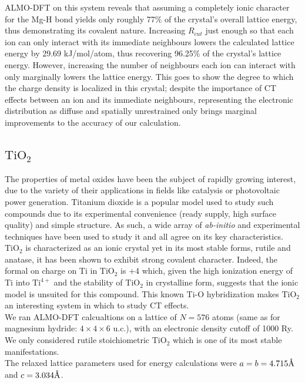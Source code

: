\documentclass[aps,prb,twocolumn,amsmath,amssymb,superscriptaddress,longbibliography]{revtex4-1}
\newcommand{\angstrom}{\text{\normalfont\AA}}
\begin{document}
ALMO-DFT on this system reveals that assuming a completely ionic character for the Mg-H bond yields only roughly 77\% of the crystal's overall lattice energy, thus demonstrating its covalent nature. 
Increasing $R_{cut}$ just enough so that each ion can only interact with its immediate neighbours lowers the calculated lattice energy by 29.69 kJ/mol/atom, thus recovering 96.25\% of the crystal's lattice energy. 
However, increasing the number of neighbours each ion can interact with only marginally lowers the lattice energy. 
This goes to show the degree to which the charge density is localized in this crystal; despite the importance of CT effects between an ion and its immediate neighbours, representing the electronic distribution as diffuse and spatially unrestrained only brings marginal improvements to the accuracy of our calculation.




\subsection*{$\text{TiO}_{2}$}


The properties of metal oxides have been the subject of rapidly growing interest, due to the variety of their applications in fields like catalysis or photovoltaic power generation. 
Titanium dioxide is a popular model used to study such compounds due to its experimental convenience (ready supply, high surface quality) and simple structure.
As such, a wide array of \emph{ab-initio} and experimental techniques have been used to study it and all agree on its key characteristics.
$\text{TiO}_{2}$ is characterized as an ionic crystal yet in its most stable forms, rutile and anatase, it has been shown to exhibit strong covalent character.
Indeed, the formal on charge on Ti in $\text{TiO}_{2}$ is +4 which, given the high ionization energy of Ti into $\text{Ti}^{4+}$ and the stability of $\text{TiO}_{2}$ in crystalline form, suggests that the ionic model is unsuited for this compound.
This known Ti-O hybridization makes $\text{TiO}_{2}$ an interesting system in which to study CT effects. \\

We ran ALMO-DFT calcualtions on a lattice of $N = 576$ atoms (same as for magnesium hydride: $4\times 4\times 6$ u.c.), with an electronic density cutoff of 1000 Ry. We only considered rutile stoichiometric $\text{TiO}_{2}$ which is one of its most stable manifestations.\\
The relaxed lattice parameters used for energy calculations were $a = b = 4.715\angstrom$ and $c = 3.034\angstrom$.\\
\end{document}
